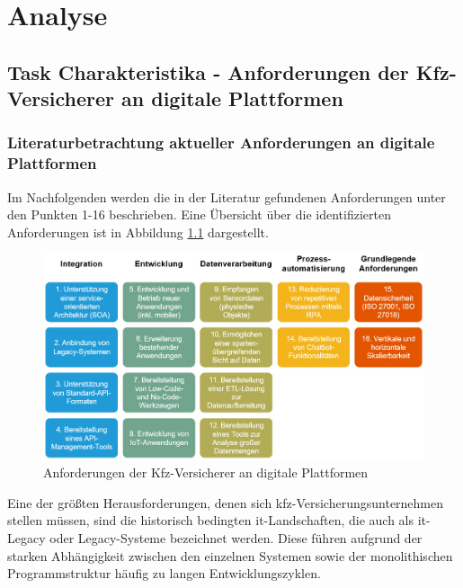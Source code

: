 \chapter{Analyse}
\section{Task Charakteristika - Anforderungen der Kfz-Versicherer an digitale Plattformen}

\subsection{Literaturbetrachtung aktueller Anforderungen an digitale Plattformen}

Im Nachfolgenden werden die in der Literatur gefundenen Anforderungen unter den Punkten 1-16 beschrieben. Eine Übersicht über die identifizierten Anforderungen ist in Abbildung \ref{fig:PPAnf} dargestellt.

\begin{figure}[h]
    \centering
    \includegraphics[width=1\textwidth]{img/PP_Anforderungen3.jpg}
    \caption[Anforderungen der Kfz-Versicherer an digitale Plattformen]{Anforderungen der Kfz-Versicherer an digitale Plattformen\autocite{PPAnf}}
    \label{fig:PPAnf}
\end{figure}

Eine der größten Herausforderungen, denen sich \ac{kfz}-Versicherungsunternehmen stellen müssen, sind die historisch bedingten \ac{it}-Landschaften, die auch als \ac{it}-Legacy oder Legacy-Systeme bezeichnet werden. Diese führen aufgrund der starken Abhängigkeit zwischen den einzelnen Systemen sowie der monolithischen Programmstruktur häufig zu langen Entwicklungszyklen. \autocite[Vgl.][S. 10-12]{GUNTER2020}

